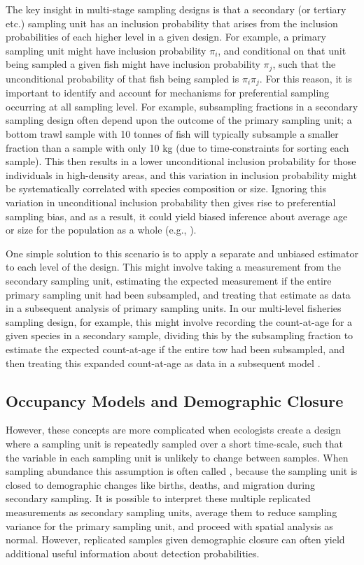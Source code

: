 The key insight in multi-stage sampling designs is that a secondary (or tertiary etc.) sampling unit has an inclusion probability that arises from the inclusion probabilities of each higher level in a given design.  For example, a primary sampling unit might have inclusion probability \( \pi_i \), and conditional on that unit being sampled a given fish might have inclusion probability \( \pi_j \), such that the unconditional probability of that fish being sampled is \(\pi_i \pi_j\).  For this reason, it is important to identify and account for mechanisms for preferential sampling occurring at all sampling level.  For example, subsampling fractions in a secondary sampling design often depend upon the outcome of the primary sampling unit;  a bottom trawl sample with 10 tonnes of fish will typically subsample a smaller fraction than a sample with only 10 kg (due to time-constraints for sorting each sample).  This then results in a lower unconditional inclusion probability for those individuals in high-density areas, and this variation in inclusion probability might be systematically correlated with species composition or size.  Ignoring this variation in unconditional inclusion probability then gives rise to preferential sampling bias, and as a result, it could yield biased inference about average age or size for the population as a whole (e.g., \cite{thorson_standardizing_2014}).

One simple solution to this scenario is to apply a separate and unbiased estimator to each level of the design.  This might involve taking a measurement from the secondary sampling unit, estimating the expected measurement if the entire primary sampling unit had been subsampled, and treating that estimate as data in a subsequent analysis of primary sampling units.  In our multi-level fisheries sampling design, for example, this might involve recording the count-at-age for a given species in a secondary sample, dividing this by the subsampling fraction to estimate the expected count-at-age if the entire tow had been subsampled, and then treating this expanded count-at-age as data in a subsequent model \cite{thorson_spatiotemporal_2018}.  

\subsection{Occupancy Models and Demographic Closure} \label{sec:Chap6_occupancy_model}

However, these concepts are more complicated when ecologists create a design where a sampling unit is repeatedly sampled over a short time-scale, such that the variable in each sampling unit is unlikely to change between samples.  When sampling abundance this assumption is often called , because the sampling unit is closed to demographic changes like births, deaths, and migration during secondary sampling.  It is possible to interpret these multiple replicated measurements as secondary sampling units, average them to reduce sampling variance for the primary sampling unit, and proceed with spatial analysis as normal.  However, replicated samples given demographic closure can often yield additional useful information about detection probabilities.  

